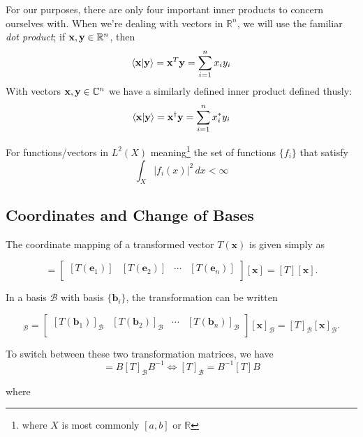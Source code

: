 \documentclass[10pt]{scrartcl}
\numberwithin{equation}{subsection}
\theoremstyle{definition}
\theoremstyle{remark}
\newcommand{\Reals}{\mathbb{R}}
\newcommand{\Complex}{\mathbb{C}}
\newcommand{\ve}[1]{
	\mathbf{#1}
}
\newcommand{\cvb}[1]{
	[\mathbf{#1}]
}
\newcommand{\inv}[1]{
	{#1}^{-1}
}
\begin{document}
For our purposes, there are only four important inner products to concern
ourselves with. When we're dealing with vectors in $\Reals^n$, we will use the
familiar \textit{dot product}; if $\vb{x}, \vb{y} \in \Reals^n$, then 
\begin{equation}
\braket{\vb{x}}{\vb{y}} = \vb{x}^T \vb{y} = \sum_{i=1}^n x_i y_i
\end{equation}
With vectors  $\vb{x}, \vb{y} \in \Complex^n$ we have a similarly defined inner
product defined thusly:
\begin{equation}
\braket{\vb{x}}{\vb{y}} = \vb{x}^\dagger \vb{y} = \sum_{i=1}^n x_i^* y_i
\end{equation}

For functions/vectors in $L^2(X)$ meaning\footnote{where $X$ is most commonly
$[a,b]$ or $\Reals$} the set of functions $\{f_i\}$ that satisfy 
\[
\int_X |f_i(x)|^2\, dx < \infty 
\]

\subsection{Coordinates and Change of Bases}

The coordinate mapping of a transformed vector $T(\ve{x})$ is given simply as

\begin{equation}
[T(\ve{x})] = 
\begin{bmatrix}
[T(\ve{e}_1)]&[T(\ve{e}_2)]&\cdots&[T(\ve{e}_n)]\\
\end{bmatrix}
\cvb{x} = [T]\cvb{x}.
\end{equation}

In a basis $\mathcal{B}$ with basis $\{\ve{b}_i\}$, the transformation can be written

\begin{equation}
[T(\ve{x})]_\mathcal{B} = 
\begin{bmatrix}
[T(\ve{b}_1)]_\mathcal{B}&[T(\ve{b}_2)]_\mathcal{B}&\cdots&[T(\ve{b}_n)]_\mathcal{B}\\
\end{bmatrix}
\cvb{x}_\mathcal{B} = [T]_\mathcal{B}\cvb{x}_\mathcal{B}.
\end{equation}

To switch between these two transformation matrices, we have
\begin{equation}
[T]=B[T]_\mathcal{B}\inv{B} \iff [T]_\mathcal{B} = \inv{B}[T]B
\end{equation}

where
\end{document}
